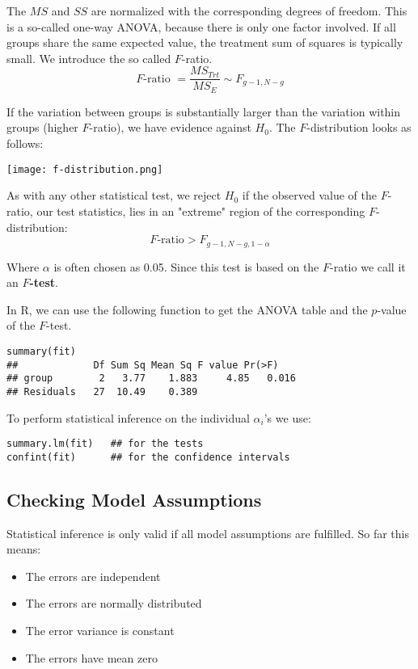 The $MS$ and $SS$ are normalized with the corresponding degrees of freedom. This is a so-called one-way ANOVA, because there is only one factor involved. If all groups share the same expected value, the treatment sum of squares is typically small. We introduce the so called $F$-ratio.
$$F\text{-ratio } = \frac{MS_{Trt}}{MS_E} \sim F_{g-1, N-g}$$

If the variation between groups is substantially larger than the variation within groups (higher $F$-ratio), we have evidence against $H_0$. The $F$-distribution looks as follows:
\begin{center}
	\texttt{[image: f-distribution.png]}
\end{center}

As with any other statistical test, we reject $H_0$ if the observed value of the $F$-ratio, our test statistics, lies in an "extreme" region of the corresponding $F$-distribution:
$$F \text{-ratio} > F_{g-1, N-g, 1 - \alpha}$$

Where $\alpha$ is often chosen as 0.05. Since this test is based on the $F$-ratio we call it an \textbf{$F$-test}.\medskip

In R, we can use the following function to get the ANOVA table and the $p$-value of the $F$-test.
\begin{lstlisting}
summary(fit)
##             Df Sum Sq Mean Sq F value Pr(>F)
## group        2   3.77    1.883     4.85   0.016
## Residuals   27  10.49    0.389
\end{lstlisting}

To perform statistical inference on the individual $\alpha_i$'s we use:
\begin{lstlisting}
summary.lm(fit)   ## for the tests
confint(fit)      ## for the confidence intervals
\end{lstlisting}


\subsection{Checking Model Assumptions}

Statistical inference is only valid if all model assumptions are fulfilled. So far this means:
\begin{itemize}
	\item The errors are independent
	\item The errors are normally distributed
	\item The error variance is constant
	\item The errors have mean zero
\end{itemize}

